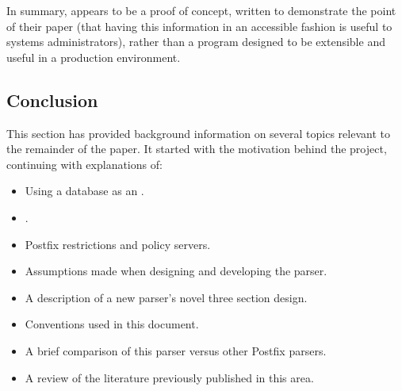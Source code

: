 In summary, \LMA{} appears to be a proof of concept, written to demonstrate
the point of their paper (that having this information in an accessible
fashion is useful to systems administrators), rather than a program
designed to be extensible and useful in a production environment.

%

\subsection{Conclusion}

This section has provided background information on several topics relevant
to the remainder of the paper.  It started with the motivation behind the
project, continuing with explanations of:

\begin{itemize}

    \item Using a database as an \API{}.

    \item \SMTP{}.

    \item Postfix restrictions and policy servers.

    \item Assumptions made when designing and developing the parser.

    \item A description of a new parser's novel three section design.

    \item Conventions used in this document.

    \item A brief comparison of this parser versus other Postfix parsers.

    \item A review of the literature previously published in this area.

\end{itemize}

